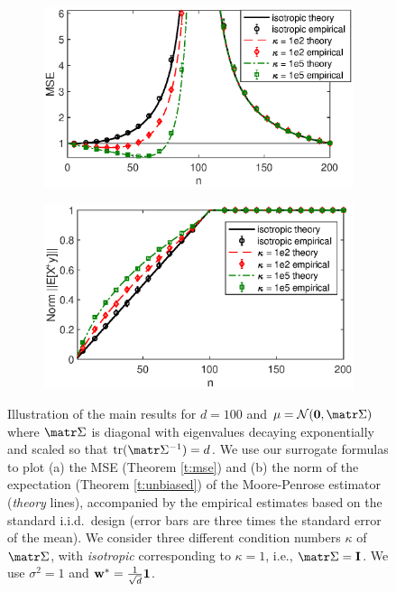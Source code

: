 \documentclass[../../thesis.tex]{subfiles}
\begin{document}
\begin{figure}[t]
  \centering
  \begin{subfigure}{0.49\textwidth}%
    \includegraphics[width=\textwidth]{design/figs/descent-intro}
  \end{subfigure}
  \hfill
  \begin{subfigure}{0.49\textwidth}
    \includegraphics[width=\textwidth]{design/figs/descent-shrinkage}
  \end{subfigure}
  \caption{Illustration of the main results for $d=100$ and
    $\mu=\Nc(\zero,\Sigmab)$ where $\Sigmab$ is diagonal with
    eigenvalues decaying exponentially and scaled so that
    $\tr(\Sigmab^{-1})=d$. We use our surrogate
    formulas to plot (a) the MSE (Theorem \ref{t:mse}) and (b) the norm of the expectation (Theorem
    \ref{t:unbiased}) of the Moore-Penrose estimator (\emph{theory}
    lines), accompanied by the empirical estimates based on the standard
    i.i.d.~design (error bars are three times the standard error of the
    mean). We consider three different condition numbers $\kappa$ of
    $\Sigmab$, with \emph{isotropic} corresponding to $\kappa=1$,
    i.e., $\Sigmab=\I$. We use $\sigma^2=1$ and
    $\mathbf w^*=\frac1{\sqrt{d}}\mathbf 1$.}
  \label{f:intro}
\end{figure}
\end{document}
